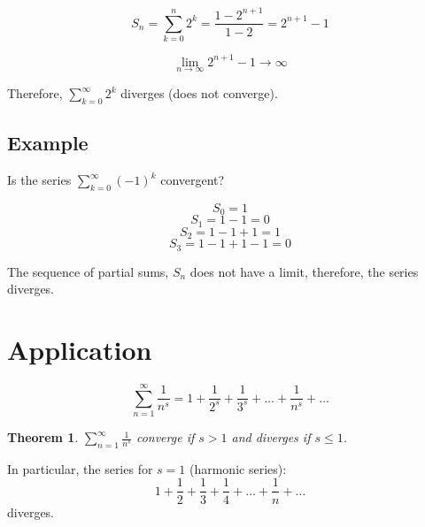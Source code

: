 \documentclass[12pt]{scrbook}
\newtheorem{theorem}{Theorem}[section]
\begin{document}
\[ S_n = \sum_{k=0}^{n} {2^k} = \frac{1-2^{n+1}}{1-2} = 2^{n+1} -1 \]

\[ \lim_{n \to \infty} 2^{n+1} - 1 \rightarrow \infty \]

Therefore, $\sum_{k=0}^{\infty} {2^k} $ diverges (does not converge).

\subsection{Example}
Is the series $\sum_{k=0}^{\infty} (-1)^k $ convergent?

\[S_0 = 1 \]
\[S_1 = 1 - 1 = 0 \]
\[S_2 = 1 - 1 + 1 = 1 \]
\[S_3 = 1 - 1 + 1 -1 = 0 \]

The sequence of partial sums, $S_n$ does not have a limit, therefore,
the series diverges.

\section{Application}

\[ \sum_{n=1}^{\infty} \frac{1}{n^s} = 1 + \frac{1}{2^s} +\frac{1}{3^s} + \ldots + \frac{1}{n^s} + \ldots \]

\begin{theorem}
$ \sum_{n=1}^{\infty} \frac{1}{n^s} $ converge if $s > 1$ and diverges
if $ s \leq 1 $.
\end{theorem}

In particular, the series for $s = 1$ (harmonic series):
\[ 1 + \frac{1}{2} + \frac{1}{3} + \frac{1}{4} + \ldots + \frac{1}{n} + \ldots \]
diverges.
\end{document}
